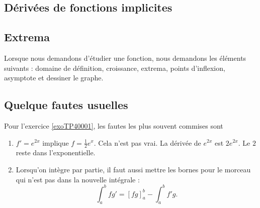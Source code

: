 \subsection{Dérivées de fonctions implicites}

\subsection{Extrema}


Lorsque nous demandons d'étudier une fonction, nous demandons les éléments suivants : domaine de définition, croissance, extrema, points d'inflexion, asymptote et dessiner le graphe.



\subsection{Quelque fautes usuelles}

Pour l'exercice \ref{exoTP40001}, les fautes les plus souvent commises sont
\begin{enumerate}

	\item
		$f'= e^{2x}$ implique $f=\frac{1}{ 2 } e^{x}$. Cela n'est pas vrai. La dérivée de $ e^{2x}$ est $2 e^{2x}$. Le $2$ reste dans l'exponentielle.

	\item
		Lorsqu'on intègre par partie, il faut aussi mettre les bornes pour le morceau qui n'est pas dans la nouvelle intégrale :
		\begin{equation}
			\int_a^b fg'=[fg]_a^b-\int_a^bf'g.
		\end{equation}
\end{enumerate}

